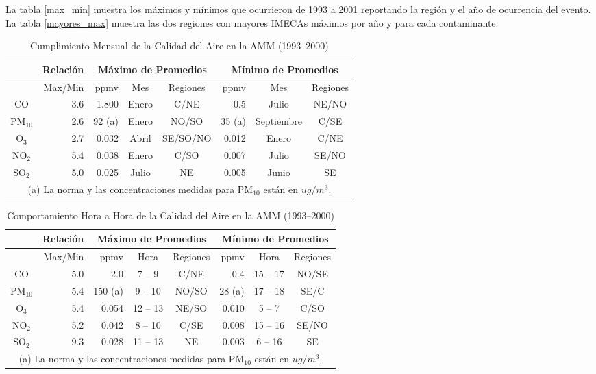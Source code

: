 La tabla \ref{max_min} muestra los máximos y mínimos que ocurrieron de 1993 a 2001 reportando la región y el año de ocurrencia del evento. La tabla \ref{mayores_max} muestra las dos regiones con mayores IMECAs máximos por año y para cada contaminante.

\begin{table}[H]
    \centering
    \caption{Cumplimiento Mensual de la Calidad del Aire en la AMM (1993--2000)}
    \begin{tabular}{|c|r|r|c|c|r|c|c|}
        \hline
	 &Relación &\multicolumn{3}{|c|}{Máximo de Promedios} &\multicolumn{3}{|c|}{Mínimo de Promedios} \\ \hline
	  &Max/Min &ppmv &Mes &Regiones &ppmv &Mes &Regiones \\ \hline
	CO &3.6 &1.800 &Enero &C/NE &0.5 &Julio &NE/NO \\ 
	PM$_{10}$ &2.6 &92 (a) &Enero &NO/SO &35 (a) &Septiembre &C/SE\\ 
	O$_{3}$ &2.7 &0.032 &Abril &SE/SO/NO &0.012 &Enero &C/NE\\ 
	NO$_{2}$ &5.4 &0.038 &Enero &C/SO &0.007 &Julio &SE/NO\\ 
	SO$_{2}$ &5.0 &0.025 &Julio &NE &0.005 &Junio &SE \\ \hline
	\multicolumn{8}{|c|}{(a) La norma y las concentraciones medidas para PM$_{10}$ están en $ug/m^{3}$.}  \\\hline
        \end{tabular}
    \label{mensual}
\end{table}

\begin{table}[H]
    \centering
    \caption{Comportamiento Hora a Hora de la Calidad del Aire en la AMM (1993--2000)}
    \begin{tabular}{|c|r|r|c|c|r|c|c|}
        \hline
	 &Relación &\multicolumn{3}{|c|}{Máximo de Promedios} &\multicolumn{3}{|c|}{Mínimo de Promedios} \\ \hline
	  &Max/Min &ppmv &Hora &Regiones &ppmv &Hora &Regiones \\ \hline
	CO  &5.0 &2.0 &7 -- 9 &C/NE &0.4 &15 -- 17 &NO/SE\\ 
	PM$_{10}$ &5.4 &150 (a) &9 -- 10 &NO/SO &28 (a) &17 -- 18 &SE/C\\ 
	O$_{3}$ &5.4 &0.054 &12 -- 13 &NE/SO &0.010 &5 -- 7 &C/SO\\ 
	NO$_{2}$ &5.2 &0.042 &8 -- 10 &C/SE &0.008 &15 -- 16 &SE/NO\\ 
	SO$_{2}$ &9.3 &0.028 &11 -- 13 &NE &0.003 &6 -- 16 &SE \\ \hline
	\multicolumn{8}{|c|}{(a) La norma y las concentraciones medidas para PM$_{10}$ están en $ug/m^{3}$.}  \\\hline
        \end{tabular}
    \label{hora}
\end{table}

